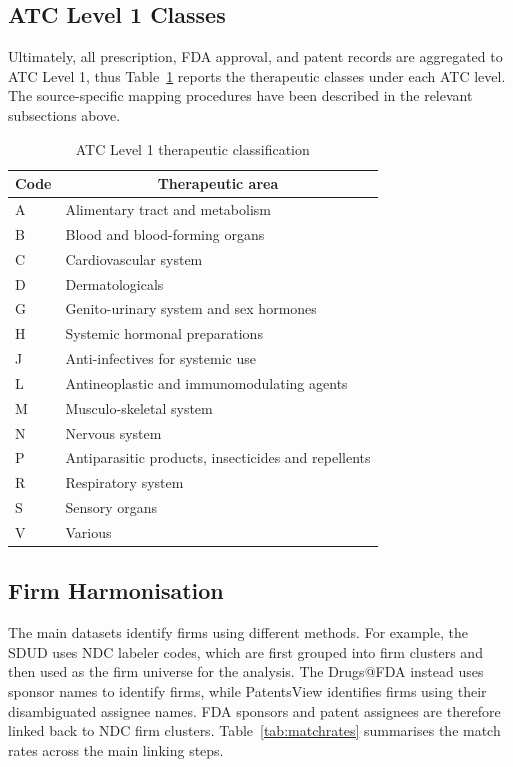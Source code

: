 \documentclass[12pt]{article}
\begin{document}
\subsection{ATC Level 1 Classes}
\label{sec:atc}

Ultimately, all prescription, FDA approval, and patent records are aggregated to ATC Level 1, thus Table~\ref{tab:atc_level1} reports the therapeutic classes under each ATC level. The source-specific mapping procedures have been described in the relevant subsections above.

\begin{table}[htbp]
\centering
\caption{ATC Level 1 therapeutic classification}
\label{tab:atc_level1}
\begin{tabular*}{\textwidth}{l @{\extracolsep{\fill}} l}
\toprule
\multicolumn{1}{c}{Code} & \multicolumn{1}{c}{Therapeutic area} \\
\midrule
A & Alimentary tract and metabolism \\
B & Blood and blood-forming organs \\
C & Cardiovascular system \\
D & Dermatologicals \\
G & Genito-urinary system and sex hormones \\
H & Systemic hormonal preparations \\
J & Anti-infectives for systemic use \\
L & Antineoplastic and immunomodulating agents \\
M & Musculo-skeletal system \\
N & Nervous system \\
P & Antiparasitic products, insecticides and repellents \\
R & Respiratory system \\
S & Sensory organs \\
V & Various \\
\bottomrule
\end{tabular*}
\end{table}

\subsection{Firm Harmonisation}
\label{sec:firmharm}

The main datasets identify firms using different methods. For example, the SDUD uses NDC labeler codes, which are first grouped into firm clusters and then used as the firm universe for the analysis. The Drugs@FDA instead uses sponsor names to identify firms, while PatentsView identifies firms using their disambiguated assignee names. FDA sponsors and patent assignees are therefore linked back to NDC firm clusters. Table~\ref{tab:matchrates} summarises the match rates across the main linking steps.
\end{document}
